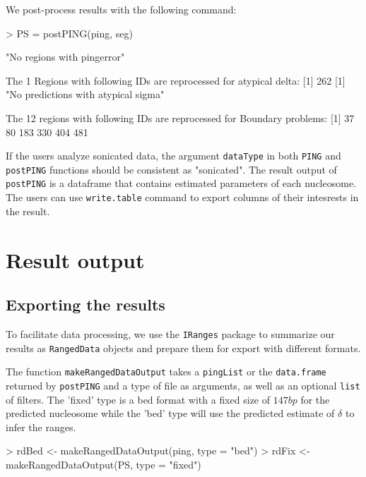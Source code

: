 \documentclass[11pt]{article}
\begin{document}
We post-process results with the following command:


\begin{Schunk}
\begin{Sinput}
> PS = postPING(ping, seg)
\end{Sinput}
\begin{Soutput}
[1] "No regions with pingerror"

 The 1 Regions with following IDs are reprocessed for atypical delta: 
[1] 262
[1] "No predictions with atypical sigma"

 The 12 regions with following IDs are reprocessed for Boundary problems: 
[1]  37  80 183 330 404 481
\end{Soutput}
\end{Schunk}
If the users analyze sonicated data, the argument \texttt{dataType} in both \texttt{PING} and \texttt{postPING} functions should be consistent as "sonicated".
The result output of \texttt{postPING} is a dataframe that contains estimated parameters of each nucleosome. The users can use \texttt{write.table} command to export columns of their intesrests in the result. 



\section{Result output}

\subsection{Exporting the results}
To facilitate data processing, we use the \texttt{IRanges} package to summarize our results as \texttt{RangedData} objects and prepare them for export with different formats.


The function \texttt{makeRangedDataOutput} takes a \texttt{pingList} or the \texttt{data.frame} returned by \texttt{postPING} and a type of file as arguments, as well as an optional \texttt{list} of filters. The 'fixed' type is a bed format with a fixed size of $147bp$ for the predicted nucleosome while the 'bed' type will use the predicted estimate of $\delta$ to infer the ranges.
\begin{Schunk}
\begin{Sinput}
> rdBed <- makeRangedDataOutput(ping, type = "bed")
> rdFix <- makeRangedDataOutput(PS, type = "fixed")
\end{Sinput}
\end{Schunk}
\end{document}

